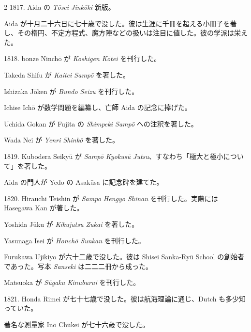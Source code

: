 \documentclass[11pt]{article}
\newcommand{\scanfooter}{}
\begin{document}
\begin{multicols}{2}
1817. Aida の \emph{Tōsei Jinkōki} 新版。

Aida が十月二十六日に七十歳で没した。彼は生涯に千冊を超える小冊子を著し、その楕円、不定方程式、魔方陣などの扱いは注目に値した。彼の学派は栄えた。

1818. bonze Ninchō が \emph{Koshigen Kōtei} を刊行した。

Takeda Shifu が \emph{Kaitei Sampō} を著した。

Ishizaka Jōken が \emph{Bundo Seizu} を刊行した。

Ichise Ichō が数学問題を編纂し、亡師 Aida の記念に捧げた。

Uchida Gokan が Fujita の \emph{Shimpeki Sampō} への注釈を著した。

Wada Nei が \emph{Yenri Shinkō} を著した。

1819. Kubodera Seikyū が \emph{Sampō Kyokusū Jutsu}、すなわち「極大と極小について」を著した。

Aida の門人が Yedo の Asakūsa に記念碑を建てた。

1820. Hirauchi Teishin が \emph{Sampō Hengyō Shinan} を刊行した。実際には Hasegawa Kan が著した。

Yoshida Jūku が \emph{Kikujutsu Zukai} を著した。

Yasunaga Isei が \emph{Honchō Sunkan} を刊行した。

Furukawa Ujikiyo が六十二歳で没した。彼は Shisei Sanka-Ryū School の創始者であった。写本 \emph{Sanseki} は二二二冊から成った。

Matsuoka が \emph{Sūgaku Kinuburui} を刊行した。

1821. Honda Rimei が七十七歳で没した。彼は航海理論に通じ、Dutch も多少知っていた。

著名な測量家 Inō Chūkei が七十六歳で没した。
\end{multicols}
\scanfooter
\end{document}
